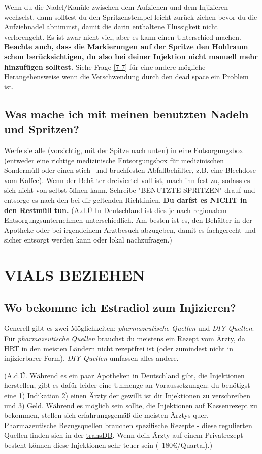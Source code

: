 \documentclass{article}
\begin{document}
Wenn du die Nadel/Kanüle zwischen dem Aufziehen und dem Injizieren wechselst, dann solltest du den Spritzenstempel leicht zurück ziehen bevor du die Aufziehnadel abnimmst, damit die darin enthaltene Flüssigkeit nicht verlorengeht. Es ist zwar nicht viel, aber es kann einen Unterschied machen. \textbf{Beachte auch, dass die Markierungen auf der Spritze den Hohlraum schon berücksichtigen, du also bei deiner Injektion nicht manuell mehr hinzufügen solltest.} Siehe Frage \ref{7-7} für eine andere mögliche Herangehensweise wenn die Verschwendung durch den dead space ein Problem ist.

\subsection{Was mache ich mit meinen benutzten Nadeln und Spritzen?}\label{5-27}

Werfe sie alle (vorsichtig, mit der Spitze nach unten) in eine Entsorgungsbox (entweder eine richtige medizinische Entsorgungsbox für medizinischen Sondermüll oder einen stich- und bruchfesten Abfallbehälter, z.B. eine Blechdose vom Kaffee). Wenn der Behälter dreiviertel-voll ist, mach ihn fest zu, sodass es sich nicht von selbst öffnen kann. Schreibe "BENUTZTE SPRITZEN" drauf und entsorge es nach den bei dir geltenden Richtlinien. \textbf{Du darfst es NICHT in den Restmüll tun.} (A.d.Ü In Deutschland ist dies je nach regionalem Entsorgungsunternehmen unterschiedlich. Am besten ist es, den Behälter in der Apotheke oder bei irgendeinem Arztbesuch abzugeben, damit es fachgerecht und sicher entsorgt werden kann oder lokal nachzufragen.)

\section{VIALS BEZIEHEN}\label{sv}

\subsection{Wo bekomme ich Estradiol zum Injizieren?}

Generell gibt es zwei Möglichkeiten: \textit{pharmazeutische Quellen} und \textit{DIY-Quellen}. Für \textit{pharmazeutische Quellen} brauchst du meistens ein Rezept vom Ärzty, da HRT in den meisten Ländern nicht rezeptfrei ist (oder zumindest nicht in injizierbarer Form). \textit{DIY-Quellen} umfassen alles andere.

(A.d.Ü. Während es ein paar Apotheken in Deutschland gibt, die Injektionen herstellen, gibt es dafür leider eine Unmenge an Voraussetzungen: du benötigst eine 1) Indikation 2) einen Ärzty der gewillt ist dir Injektionen zu verschreiben und 3) Geld. Während es möglich sein sollte, die Injektionen auf Kassenrezept zu bekommen, stellen sich erfahrungsgemäß die meisten Ärztys quer. Pharmazeutische Bezugsquellen brauchen spezifische Rezepte - diese regulierten Quellen finden sich in der \href{https://transdb.de/search?type=pharmacy&offers=eInjection}{trans\*DB}. Wenn dein Ärzty auf einem Privatrezept besteht können diese Injektionen sehr teuer sein (~180€/Quartal).)
\end{document}

